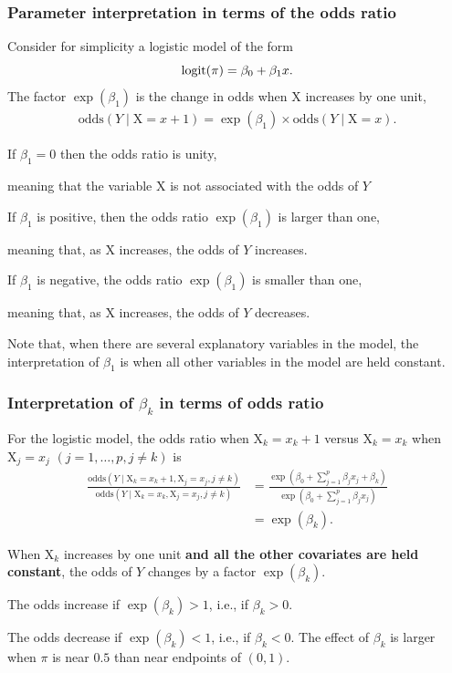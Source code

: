 \documentclass{beamer}
\begin{document}
\begin{frame}[fragile]
\frametitle{Parameter interpretation in terms of the odds ratio}
Consider for simplicity a logistic model of the form 
\[\operatorname{logit}(\pi) = \beta_0 + \beta_1x.\]
The factor $\exp(\beta_1)$ is the change in odds when $\mathrm{X}$ increases by one unit,
\begin{align*}
\mathrm{odds}(Y \mid  \mathrm{X}=x+1) = \exp(\beta_1) \times \mathrm{odds}(Y \mid  \mathrm{X}=x).
\end{align*}
\bi
\item If $\beta_1=0$ then the odds ratio is unity,
\bi
 \item[] meaning that the variable $\mathrm{X}$ is not associated with the odds of $Y$
\ei
\item If $\beta_1$ is positive, then the odds ratio $\exp(\beta_1)$ is larger than one,
\bi
 
\item[] meaning that, as $\mathrm{X}$ increases, the odds of $Y$ increases.
\ei
\item If $\beta_1$ is negative, the odds ratio $\exp(\beta_1)$ is smaller than one,
\bi
 
\item[] meaning that, as $\mathrm{X}$ increases, the odds of $Y$ decreases.
\ei
\ei 

\footnotesize{Note that, when there are several explanatory variables in the model, the interpretation of $\beta_1$ is \alert{when all other variables in the model are held constant.}

}

\end{frame}
\begin{frame}[fragile]
\frametitle{Interpretation of $\beta_k$ in terms of odds ratio}

For the logistic model,  the \alert{odds ratio} when $\mathrm{X}_k=x_k+1$ versus $\mathrm{X}_k=x_k$ when $\mathrm{X}_j=x_j$ $(j=1, \ldots, p, j \neq k)$ is
{\small
\begin{align*}
\frac{\mathrm{odds}(Y \mid  \mathrm{X}_k=x_k+1, \mathrm{X}_j=x_j, j\neq k)}{\mathrm{odds}(Y \mid \mathrm{X}_k=x_k, \mathrm{X}_j=x_j, j \neq k)}&=\frac{\exp\left(\beta_0+ \sum_{j=1}^p\beta_j x_j + \beta_k \right)}{\exp\left(\beta_0+ \sum_{j=1}^p\beta_j x_j \right)}\\
&= \exp(\beta_k).
\end{align*}
}

When $\mathrm{X}_k$ increases by one unit \textbf{and all the other covariates are held constant}, the odds of $Y$ changes by a factor $\exp(\beta_k)$.
\bi \item The odds increase if $\exp(\beta_k) >1$, i.e., if $\beta_k>0$.
\item The odds decrease if $\exp(\beta_k) < 1$, i.e., if $\beta_k<0$.
\ei
The effect of $\beta_k$ is larger when $\pi$ is near $0.5$ than near endpoints of $(0, 1)$.
\end{frame}
\end{document}
